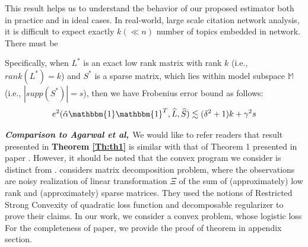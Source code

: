\documentclass[AMS,STIX1COL]{WileyNJD-v2}
\begin{document}
This result helps us to understand the behavior of our proposed estimator both in practice and in ideal cases.
In real-world, large scale citation network analysis, it is difficult to expect exactly $k(\ll n)$ number of topics embedded in network. There must be 


Specifically, when $L^*$ is an exact low rank matrix with rank $k$ (i.e., $rank(L^*)=k$) and $S^*$ is a sparse matrix, which lies within model subspace $\mathbb{M}$ (i.e., $|supp(S^*)|=s$), then we have Frobenius error bound as follows:
\[
    e^{2}(\hat{\alpha}\mathbbm{1}\mathbbm{1}^T,\widehat{L},\widehat{S}) \lesssim (\delta^2+1)k+\gamma^2s
\]


\emph{\textbf{Comparison to Agarwal et al, \cite{agarwal2012noisy}}}
We would like to refer readers that result presented in \textbf{Theorem \ref{Th:th1}} is similar with that of Theorem 1 presented in paper \cite{agarwal2012noisy}. 
However, it should be noted that the convex program we consider is distinct from \cite{agarwal2012noisy}.
\cite{agarwal2012noisy} considers matrix decomposition problem, where the observations are noisy realization of linear transformation $\Xi$ of the sum of (approximately) low rank and (approximately) sparse matrices. 
They used the notions of Restricted Strong Convexity of quadratic loss function and decomposable regularizer to prove their claims. In our work, we consider a convex problem, whose logistic loss 
For the completeness of paper, we provide the proof of theorem in appendix section.
\end{document}
